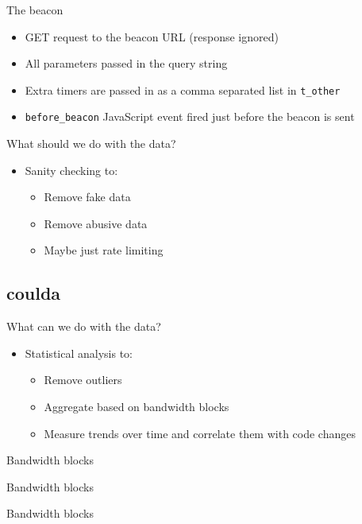 \documentclass{beamer}
\begin{document}
\begin{frame}{The beacon}
  \begin{itemize}
  \item GET request to the beacon URL (response ignored)
  \item All parameters passed in the query string
  \item Extra timers are passed in as a comma separated list in \texttt{t\_other}
  \item \texttt{before\_beacon} JavaScript event fired just before the beacon is sent
  \end{itemize}
\end{frame}

\begin{frame}{What should we do with the data?}
  \begin{itemize}
  \item Sanity checking to:
    \begin{itemize}
    \item Remove fake data
    \item Remove abusive data
    \item Maybe just rate limiting
    \end{itemize}
  \end{itemize}
\end{frame}

\subsection{coulda}
\begin{frame}{What can we do with the data?}
  \begin{itemize}
  \item Statistical analysis to:
    \begin{itemize}
    \item Remove outliers
    \item Aggregate based on bandwidth blocks
    \item Measure trends over time and correlate them with code changes
    \end{itemize}
  \end{itemize}
\end{frame}

\begin{frame}{Bandwidth blocks}
\end{frame}
\begin{frame}{Bandwidth blocks}
\end{frame}
\begin{frame}{Bandwidth blocks}
\end{frame}
\end{document}
